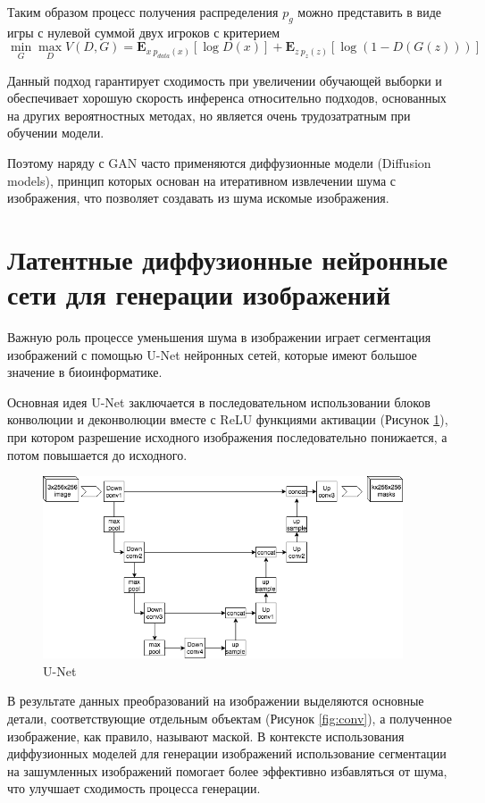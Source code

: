Таким образом процесс получения распределения $p_g$ можно представить в виде игры с нулевой суммой двух игроков
с критерием \cite{gan}
$$
\min_{G}\max_{D} V(D, G) = \mathbf{E}_{x~p_{data}(x)}[\log D(x)] + \mathbf{E}_{z~p_{z}(z)}[\log (1 - D(G(z)))]
$$ 

Данный подход гарантирует сходимость при увеличении обучающей выборки и обеспечивает хорошую скорость инференса относительно подходов,
основанных на других вероятностных методах, но является очень трудозатратным при обучении модели.

Поэтому наряду с GAN часто применяются диффузионные модели (Diffusion models), принцип которых основан на 
итеративном извлечении шума с изображения, что позволяет создавать из шума искомые изображения.
\section{Латентные диффузионные нейронные сети для генерации изображений}


Важную роль процессе уменьшения шума в изображении играет сегментация изображений с помощью U-Net нейронных сетей,
которые имеют большое значение в биоинформатике.

Основная идея U-Net заключается в последовательном использовании блоков конволюции и деконволюции вместе с ReLU 
функциями активации (Рисунок \ref{fig:unet}), при котором разрешение исходного изображения последовательно понижается, а потом повышается
до исходного. 


\begin{figure}[H]
  \centering
  \includegraphics[width=0.95\textwidth]{img/unet.png}
  \caption{U-Net \cite{rombach2022high}}
    \label{fig:unet}
\end{figure}


В результате данных преобразований на изображении выделяются основные детали, соответствующие отдельным объектам (Рисунок \ref{fig:conv}), а полученное изображение,
как правило, называют маской. В контексте использования диффузионных моделей для генерации изображений использование
сегментации на зашумленных изображений помогает более эффективно избавляться от шума, что улучшает сходимость процесса генерации.

